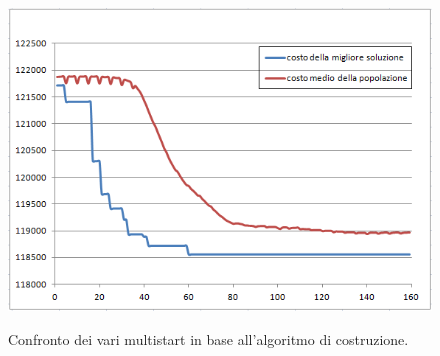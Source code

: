 \begin{figure}[h] 
\begin{center} 
  \includegraphics[scale=0.8]{Images/cost_genetic}\\ 
  \caption{\footnotesize{Confronto dei vari multistart in base all'algoritmo di costruzione.}}
  \label{perf_profile} 
\end{center} 
\end{figure}